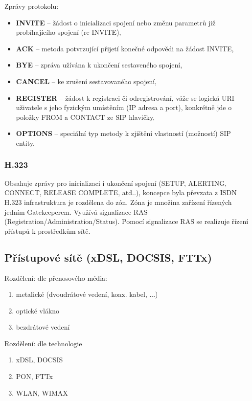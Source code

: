 Zprávy protokolu:
\begin{itemize}


\item \textbf{INVITE} -- žádost o inicializaci spojení nebo změnu parametrů již probíhajícího spojení (re-INVITE),
\item \textbf{ACK} -- metoda potvrzující přijetí konečné odpovědi na žádost INVITE,
\item \textbf{BYE} -- zpráva užívána k ukončení sestaveného spojení,
\item \textbf{CANCEL} -- ke zrušení sestavovaného spojení,
\item \textbf{REGISTER} -- žádost k registraci či odregistrování, váže se logická URI uživatele s jeho fyzickým umístěním (IP adresa a port), konkrétně jde o položky FROM a CONTACT ze SIP hlavičky,
\item \textbf{OPTIONS} -- speciální typ metody k zjištění vlastností (možností) SIP entity.
\end{itemize}

\subsubsection{H.323}
Obsahuje zprávy pro inicializaci i ukončení spojení (SETUP, ALERTING, CONNECT, RELEASE COMPLETE, atd..), koncepce byla převzata z ISDN H.323 infrastruktura je rozdělena do zón. Zóna je množina zařízení řízených jedním Gatekeeperem.  Využívá signalizace RAS (Registration/Administration/Status). Pomocí signalizace RAS se realizuje řízení přístupů k prostředkům sítě.


\subsection{Přístupové sítě (xDSL, DOCSIS, FTTx)}
Rozdělení: dle přenosového média:
\begin{enumerate}
\item metalické (dvoudrátové vedení, koax. kabel, ...)
\item optické vlákno
\item bezdrátové vedení
\end{enumerate}
Rozdělení: dle technologie
\begin{enumerate}
\item xDSL, DOCSIS
\item PON, FTTx
\item WLAN, WIMAX
\end{enumerate}

